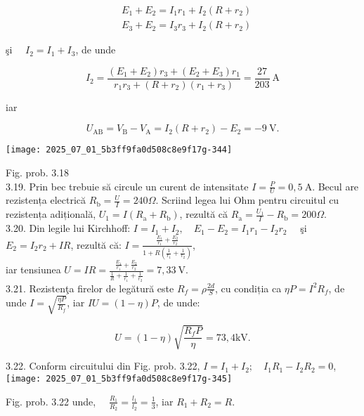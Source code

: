 $$
\begin{aligned}
& E_{1}+E_{2}=I_{1} r_{1}+I_{2}\left(R+r_{2}\right) \\
& E_{3}+E_{2}=I_{3} r_{3}+I_{2}\left(R+r_{2}\right)
\end{aligned}
$$

şi $\quad I_{2}=I_{1}+I_{3}$, de unde

$$
I_{2}=\frac{\left(E_{1}+E_{2}\right) r_{3}+\left(E_{2}+E_{3}\right) r_{1}}{r_{1} r_{3}+\left(R+r_{2}\right)\left(r_{1}+r_{3}\right)}=\frac{27}{203} \mathrm{~A}
$$

iar

$$
U_{\mathrm{AB}}=V_{\mathrm{B}}-V_{\mathrm{A}}=I_{2}\left(R+r_{2}\right)-E_{2}=-9 \mathrm{~V} .
$$

\begin{center}
\texttt{[image: 2025\_07\_01\_5b3ff9fa0d508c8e9f17g-344]}
\end{center}

Fig. prob. 3.18\\
3.19. Prin bec trebuie să circule un curent de intensitate $I=\frac{P}{U}=0,5 \mathrm{~A}$. Becul are rezistența electrică $R_{\mathrm{b}}=\frac{U}{I}=240 \Omega$. Scriind legea lui Ohm pentru circuitul cu rezistența adițională, $U_{1}=I\left(R_{\mathrm{a}}+R_{\mathrm{b}}\right)$, rezultă că $R_{\mathrm{a}}=\frac{U_{1}}{I}-R_{\mathrm{b}}=200 \Omega$.\\
3.20. Din legile lui Kirchhoff: $I=I_{1}+I_{2}, \quad E_{1}-E_{2}=I_{1} r_{1}-I_{2} r_{2} \quad$ şi $E_{2}=I_{2} r_{2}+I R$, rezultă că: $I=\frac{\frac{E_{1}}{r_{1}}+\frac{E_{2}}{r_{2}}}{1+R\left(\frac{1}{r_{1}}+\frac{1}{r_{2}}\right)}$,\\
iar tensiunea $U=I R=\frac{\frac{E_{1}}{r_{1}}+\frac{E_{2}}{r_{2}}}{\frac{1}{R}+\frac{1}{r_{1}}+\frac{1}{r_{2}}}=7,33 \mathrm{~V}$.\\
3.21. Rezistenţa firelor de legătură este $R_{f}=\rho \frac{2 d}{S}$, cu condiția ca $\eta P=I^{2} R_{f}$, de unde $I=\sqrt{\frac{\eta P}{R_{f}}}$, iar $I U=(1-\eta) P$, de unde:

$$
U=(1-\eta) \sqrt{\frac{R_{f} P}{\eta}}=73,4 \mathrm{kV} .
$$

3.22. Conform circuitului din Fig. prob. 3.22, $I=I_{1}+I_{2} ; \quad I_{1} R_{1}-I_{2} R_{2}=0$,\\
\texttt{[image: 2025\_07\_01\_5b3ff9fa0d508c8e9f17g-345]}

Fig. prob. 3.22 unde, $\quad \frac{R_{1}}{R_{2}}=\frac{l_{1}}{l_{2}}=\frac{1}{3}$, iar $R_{1}+R_{2}=R$.

